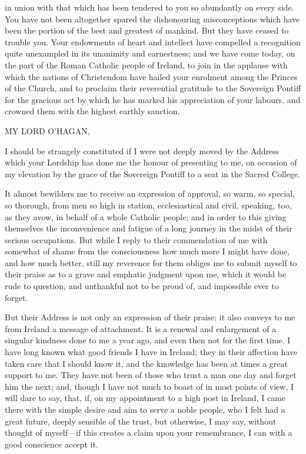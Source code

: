 in union with that which has been tendered to you so abundantly on
every side. You have not been altogether spared the dishonouring
misconceptions which have been the portion of the best and greatest of
mankind. But they have ceased to trouble you. Your endowments of heart
and intellect have compelled a recognition quite unexampled in its
unanimity and earnestness; and we have come today, on the part of the
Roman Catholic people of Ireland, to join in the applause with which
the nations of Christendom have hailed your enrolment among the
Princes of the Church, and to proclaim their reverential gratitude to
the Sovereign Pontiff for the gracious act by which he has marked his
appreciation of your labours, and crowned them with the highest
earthly sanction.


MY LORD O'HAGAN,

I should be strangely constituted if I were not deeply moved by the
Address which your Lordship has done me the honour of presenting to
me, on occasion of my elevation by the grace of the Sovereign Pontiff
to a seat in the Sacred College.

It almost bewilders me to receive an expression of approval, so
warm, so special, so thorough, from men so high in station,
ecclesiastical and civil, speaking, too, as they avow, in behalf of a
whole Catholic people; and in order to this giving themselves the
inconvenience and fatigue of a long journey in the midst of their
serious occupations. But while I reply to their commendation of me
with somewhat of shame from the consciousness how much more I might
have done, and how much better, still my reverence for them obliges me
to submit myself to their praise as to a grave and emphatic judgment
upon me, which it would be rude to question, and unthankful not to be
proud of, and impossible ever to forget.

But their Address is not only an expression of their praise; it
also conveys to me from Ireland a message of attachment. It is a
renewal and enlargement of a singular kindness done to me a year ago,
and even then not for the first time. I have long known what good
friends I have in Ireland; they in their affection have taken care
that I should know it, and the knowledge has been at times a great
support to me. They have not been of those who trust a man one day and
forget him the next; and, though I have not much to boast of in most
points of view, I will dare to say, that, if, on my appointment to a
high post in Ireland, I came there with the simple desire and aim to
serve a noble people, who I felt had a great future, deeply sensible
of the trust, but otherwise, I may say, without thought of myself—if
this creates a claim upon your remembrance, I can with a good
conscience accept it.

